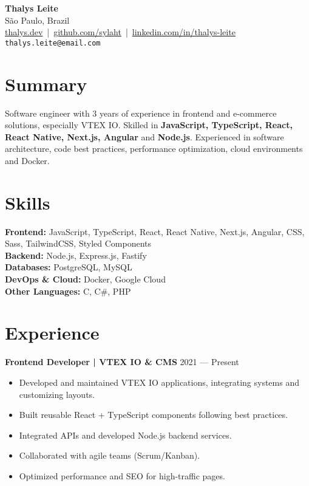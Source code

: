 \documentclass[a4paper,10pt]{article}
\begin{document}
\begin{center}
    {\LARGE \textbf{Thalys Leite}}\\[2mm]
    São Paulo, Brazil \\[1mm]
    \href{https://thalys.dev}{thalys.dev} \,|\, 
    \href{https://github.com/sylaht}{github.com/sylaht} \,|\, 
    \href{https://www.linkedin.com/in/thalys-leite-94a80a234/}{linkedin.com/in/thalys-leite}\\[2mm]
    \texttt{thalys.leite@email.com}
\end{center}

\vspace{0.3cm}

\section*{Summary}
Software engineer with 3 years of experience in frontend and e-commerce solutions, especially VTEX IO.
Skilled in \textbf{JavaScript, TypeScript, React, React Native, Next.js, Angular} and \textbf{Node.js}.
Experienced in software architecture, code best practices, performance optimization, cloud environments and Docker.

\section*{Skills}
\textbf{Frontend:} JavaScript, TypeScript, React, React Native, Next.js, Angular, CSS, Sass, TailwindCSS, Styled Components\\
\textbf{Backend:} Node.js, Express.js, Fastify\\
\textbf{Databases:} PostgreSQL, MySQL\\
\textbf{DevOps \& Cloud:} Docker, Google Cloud\\
\textbf{Other Languages:} C, C\#, PHP

\section*{Experience}
\textbf{Frontend Developer | VTEX IO \& CMS} \hfill 2021 — Present\\[-4pt]
\begin{itemize}[leftmargin=1.2em, noitemsep, topsep=3pt]
    \item Developed and maintained VTEX IO applications, integrating systems and customizing layouts.
    \item Built reusable React + TypeScript components following best practices.
    \item Integrated APIs and developed Node.js backend services.
    \item Collaborated with agile teams (Scrum/Kanban).
    \item Optimized performance and SEO for high-traffic pages.
\end{itemize}
\end{document}
